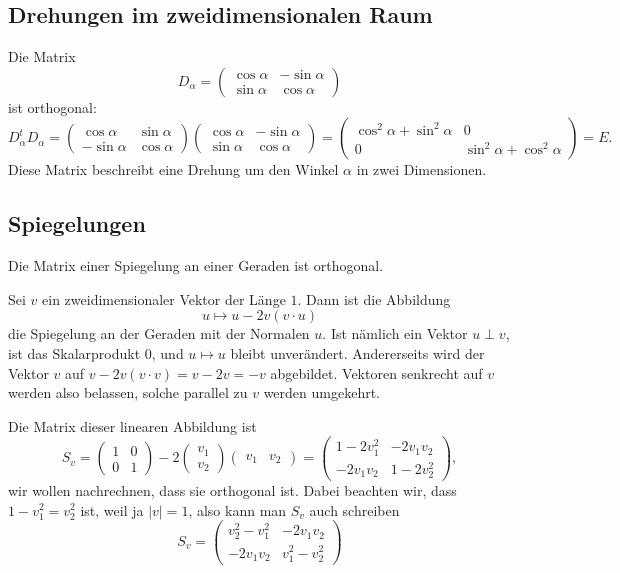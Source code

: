 \subsection{Drehungen im zweidimensionalen Raum}
Die Matrix
\[
D_\alpha
=
\begin{pmatrix}
\cos\alpha&-\sin\alpha\\
\sin\alpha& \cos\alpha
\end{pmatrix}
\]
ist orthogonal:
\[
D_\alpha^tD_\alpha
=
\begin{pmatrix}
 \cos\alpha&\sin\alpha\\
-\sin\alpha&\cos\alpha
\end{pmatrix}
\begin{pmatrix}
\cos\alpha&-\sin\alpha\\
\sin\alpha& \cos\alpha
\end{pmatrix}
=
\begin{pmatrix}
\cos^2\alpha+\sin^2\alpha&0\\
0&\sin^2\alpha+\cos^2\alpha
\end{pmatrix}
=E.
\]
Diese Matrix beschreibt eine Drehung um den Winkel $\alpha$
in zwei Dimensionen.

\subsection{Spiegelungen}
Die Matrix einer Spiegelung an einer Geraden ist orthogonal.

\smallskip

{\parindent 0pt
Sei} $v$ ein zweidimensionaler Vektor der Länge $1$.
Dann ist die Abbildung 
\[
u\mapsto u-2v(v\cdot u)
\]
die Spiegelung an der Geraden mit der Normalen $u$.
Ist nämlich
ein Vektor $u\perp v$, ist das Skalarprodukt $0$, und $u\mapsto u$
bleibt unverändert.
Andererseits wird der Vektor $v$ auf
$v-2v(v\cdot v)=v-2v=-v$ abgebildet.
Vektoren senkrecht auf $v$
werden also belassen, solche parallel zu $v$ werden umgekehrt.

Die Matrix dieser linearen Abbildung ist
\[
S_v=\begin{pmatrix}1&0\\0&1\end{pmatrix}
-
2\begin{pmatrix}v_1\\v_2\end{pmatrix}
\begin{pmatrix}v_1&v_2\end{pmatrix}
=
\begin{pmatrix}
1-2v_1^2&-2v_1v_2\\
-2v_1v_2&1-2v_2^2
\end{pmatrix},
\]
wir wollen nachrechnen, dass sie orthogonal ist.
Dabei beachten
wir, dass $1-v_1^2=v_2^2$ ist, weil ja $|v|=1$, also kann man $S_v$
auch schreiben
\[
S_v=\begin{pmatrix}
v_2^2-v_1^2&-2v_1v_2\\
-2v_1v_2&v_1^2-v_2^2
\end{pmatrix}
\]

